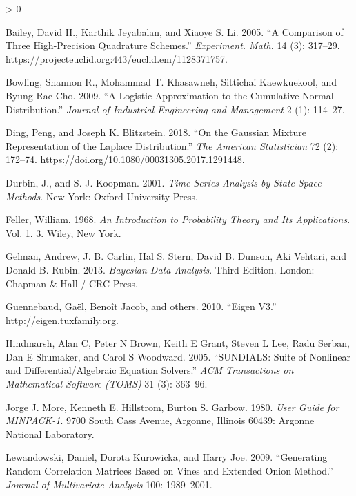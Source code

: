 \documentclass[
  10pt,
]{book}
\newlength{\cslhangindent}
\newenvironment{CSLReferences}[2] %
 {%
  \setlength{\parindent}{0pt}
  \ifodd #1 \everypar{\setlength{\hangindent}{\cslhangindent}}\ignorespaces\fi
  \ifnum #2 > 0
  \setlength{\parskip}{#2\baselineskip}
  \fi
 }%
 {}
\begin{document}
\hypertarget{refs}{}
\begin{CSLReferences}{1}{0}
\leavevmode\hypertarget{ref-Bailey:2005}{}%
Bailey, David H., Karthik Jeyabalan, and Xiaoye S. Li. 2005. {``A Comparison of Three High-Precision Quadrature Schemes.''} \emph{Experiment. Math.} 14 (3): 317--29. \url{https://projecteuclid.org:443/euclid.em/1128371757}.

\leavevmode\hypertarget{ref-BowlingEtAl:2009}{}%
Bowling, Shannon R., Mohammad T. Khasawneh, Sittichai Kaewkuekool, and Byung Rae Cho. 2009. {``A Logistic Approximation to the Cumulative Normal Distribution.''} \emph{Journal of Industrial Engineering and Management} 2 (1): 114--27.

\leavevmode\hypertarget{ref-Ding:18}{}%
Ding, Peng, and Joseph K. Blitzstein. 2018. {``On the Gaussian Mixture Representation of the Laplace Distribution.''} \emph{The American Statistician} 72 (2): 172--74. \url{https://doi.org/10.1080/00031305.2017.1291448}.

\leavevmode\hypertarget{ref-DurbinKoopman:2001}{}%
Durbin, J., and S. J. Koopman. 2001. \emph{Time Series Analysis by State Space Methods}. New York: Oxford University Press.

\leavevmode\hypertarget{ref-Feller1968}{}%
Feller, William. 1968. \emph{An Introduction to Probability Theory and Its Applications}. Vol. 1. 3. Wiley, New York.

\leavevmode\hypertarget{ref-GelmanEtAl:2013}{}%
Gelman, Andrew, J. B. Carlin, Hal S. Stern, David B. Dunson, Aki Vehtari, and Donald B. Rubin. 2013. \emph{Bayesian Data Analysis}. Third Edition. London: Chapman \& Hall / CRC Press.

\leavevmode\hypertarget{ref-Eigen:2013}{}%
Guennebaud, Gaël, Benoît Jacob, and others. 2010. {``Eigen V3.''} http://eigen.tuxfamily.org.

\leavevmode\hypertarget{ref-Hindmarsh:2005}{}%
Hindmarsh, Alan C, Peter N Brown, Keith E Grant, Steven L Lee, Radu Serban, Dan E Shumaker, and Carol S Woodward. 2005. {``{SUNDIALS}: Suite of Nonlinear and Differential/Algebraic Equation Solvers.''} \emph{ACM Transactions on Mathematical Software (TOMS)} 31 (3): 363--96.

\leavevmode\hypertarget{ref-minpack:1980}{}%
Jorge J. More, Kenneth E. Hillstrom, Burton S. Garbow. 1980. \emph{User Guide for MINPACK-1}. 9700 South Cass Avenue, Argonne, Illinois 60439: Argonne National Laboratory.

\leavevmode\hypertarget{ref-LewandowskiKurowickaJoe:2009}{}%
Lewandowski, Daniel, Dorota Kurowicka, and Harry Joe. 2009. {``Generating Random Correlation Matrices Based on Vines and Extended Onion Method.''} \emph{Journal of Multivariate Analysis} 100: 1989--2001.


\end{CSLReferences}
\end{document}
